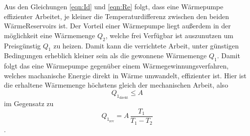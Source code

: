 Aus den Gleichungen \ref{eqn:Id} und \ref{eqn:Re} folgt, dass eine Wärmepumpe effizienter Arbeitet, je kleiner die Temperaturdifferenz
zwischen den beiden WärmeReservoirs ist. Der Vorteil einer Wärmepumpe liegt außerdem in der möglichkeit eine Wärmemenge $Q_2$, welche frei Verfügbar ist 
auszunutzen um Preisgünstig $Q_1$ zu heizen. Damit kann die verrichtete Arbeit, unter günstigen Bedingungen erheblich kleiner sein als die gewonnene Wärmemenge $Q_1$.
Damit folgt das eine Wärmepumpe gegenüber einem Wärmegewinnungsverfahren, welches machanische Energie direkt in Wärme umwandelt, effizienter ist.
Hier ist die erhaltene Wärmemenge höchstens gleich der mechanischen Arbeit, also
\begin{equation*}
    Q_{1_\text{direkt}}\leq A
\end{equation*}
im Gegensatz zu
\begin{equation*}
    Q_{1_\text{rev}}=A\,\frac{T_1}{T_1-T_2}
\end{equation*}.



